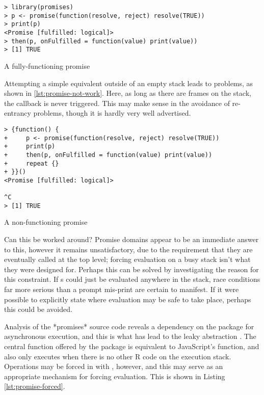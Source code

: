 \begin{listing}
\begin{verbatim}
> library(promises)
> p <- promise(function(resolve, reject) resolve(TRUE))
> print(p)
<Promise [fulfilled: logical]>
> then(p, onFulfilled = function(value) print(value))
> [1] TRUE
\end{verbatim}
\caption{A fully-functioning promise}
\label{lst:promise-work}
\end{listing}

Attempting a simple equivalent outside of an empty stack leads to problems, as shown in \cref{lst:promise-not-work}.
Here, as long as there are frames on the stack, the  callback is never triggered.
This may make sense in the avoidance of re-entrancy problems, though it is hardly very well advertised.

\begin{listing}
\begin{verbatim}
> {function() {
+     p <- promise(function(resolve, reject) resolve(TRUE))
+     print(p)
+     then(p, onFulfilled = function(value) print(value))
+     repeat {}
+ }}()
<Promise [fulfilled: logical]>

^C
> [1] TRUE
\end{verbatim}
\caption{A non-functioning promise}
\label{lst:promise-not-work}
\end{listing}

Can this be worked around?
Promise domains appear to be an immediate answer to this, however it remains unsatisfactory, due to the requirement that they are eventually called at the top level; forcing evaluation on a busy stack isn't what they were designed for.
Perhaps this can be solved by investigating the reason for this constraint.
If s could just be evaluated anywhere in the stack, race conditions far more serious than a prompt mis-print are certain to manifest.
If it were possible to explicitly state where evaluation may be safe to take place, perhaps this could be avoided.

Analysis of the *promises* source code reveals a dependency on the  package for asynchronous execution, and this is what has lead to the leaky abstraction \cite{chang2021later}.
The central  function offered by the package is equivalent to JavaScript's  function, and also only executes when there is no other R code on the execution stack.
Operations may be forced in  with , however, and this may serve as an appropriate mechanism for forcing evaluation.
This is shown in Listing \cref{lst:promise-forced}.

